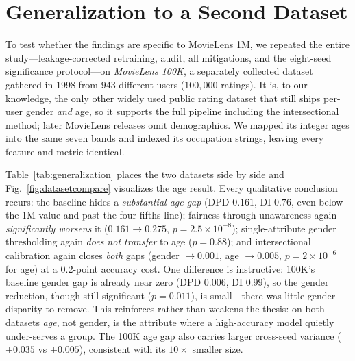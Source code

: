 \documentclass[conference]{IEEEtran}
\begin{document}
\section{Generalization to a Second Dataset}\label{sec:generalization}
To test whether the findings are specific to MovieLens 1M, we repeated the entire
study---leakage-corrected retraining, audit, all mitigations, and the eight-seed
significance protocol---on \emph{MovieLens 100K}, a separately collected dataset gathered
in 1998 from $943$ different users ($100{,}000$ ratings). It is, to our knowledge, the only
other widely used public rating dataset that still ships per-user gender \emph{and} age,
so it supports the full pipeline including the intersectional method; later MovieLens
releases omit demographics. We mapped its integer ages into the same seven bands and
indexed its occupation strings, leaving every feature and metric identical.

Table~\ref{tab:generalization} places the two datasets side by side and
Fig.~\ref{fig:datasetcompare} visualizes the age result. Every qualitative conclusion
recurs: the baseline hides a \emph{substantial age gap} (DPD $0.161$, DI $0.76$, even
below the 1M value and past the four-fifths line); fairness through unawareness again
\emph{significantly worsens} it ($0.161\rightarrow0.275$, $p=2.5\times10^{-8}$);
single-attribute gender thresholding again \emph{does not transfer} to age
($p=0.88$); and intersectional calibration again closes \emph{both} gaps (gender
$\rightarrow0.001$, age $\rightarrow0.005$, $p=2\times10^{-6}$ for age) at a
$0.2$-point accuracy cost. One difference is instructive: 100K's baseline gender gap is
already near zero (DPD $0.006$, DI $0.99$), so the gender reduction, though still
significant ($p=0.011$), is small---there was little gender disparity to remove. This
reinforces rather than weakens the thesis: on both datasets \emph{age}, not gender, is the
attribute where a high-accuracy model quietly under-serves a group. The 100K age gap also
carries larger cross-seed variance ($\pm0.035$ vs $\pm0.005$), consistent with its
$10\times$ smaller size.
\end{document}
